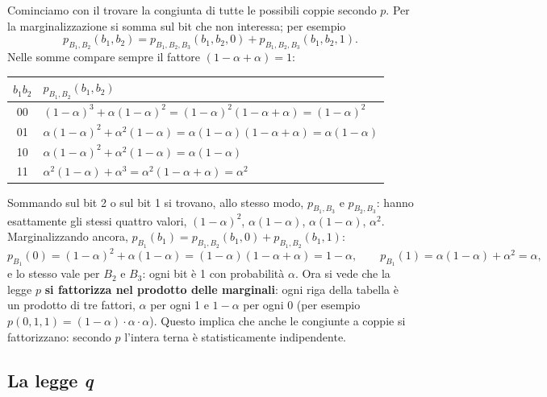Cominciamo con il trovare la congiunta di tutte le possibili coppie secondo $p$. Per la marginalizzazione si somma
sul bit che non interessa; per esempio
\[ p_{B_1,B_2}(b_1, b_2) = p_{B_1,B_2,B_3}(b_1, b_2, 0) + p_{B_1,B_2,B_3}(b_1, b_2, 1) . \]
Nelle somme compare sempre il fattore $(1 - \alpha + \alpha) = 1$:
\begin{center}
\renewcommand{\arraystretch}{1.3}
\begin{tabular}{@{}cl@{}}
  \toprule
  $b_1 b_2$ & $p_{B_1,B_2}(b_1, b_2)$ \\
  \midrule
  00 & $(1-\alpha)^3 + \alpha(1-\alpha)^2 = (1-\alpha)^2 (1 - \alpha + \alpha) = (1-\alpha)^2$ \\
  01 & $\alpha(1-\alpha)^2 + \alpha^2(1-\alpha) = \alpha(1-\alpha)(1 - \alpha + \alpha) = \alpha(1-\alpha)$ \\
  10 & $\alpha(1-\alpha)^2 + \alpha^2(1-\alpha) = \alpha(1-\alpha)$ \\
  11 & $\alpha^2(1-\alpha) + \alpha^3 = \alpha^2(1 - \alpha + \alpha) = \alpha^2$ \\
  \bottomrule
\end{tabular}
\end{center}
Sommando sul bit 2 o sul bit 1 si trovano, allo stesso modo, $p_{B_1,B_3}$ e $p_{B_2,B_3}$: hanno esattamente gli
stessi quattro valori, $(1-\alpha)^2$, $\alpha(1-\alpha)$, $\alpha(1-\alpha)$, $\alpha^2$. Marginalizzando ancora,
$p_{B_1}(b_1) = p_{B_1,B_2}(b_1, 0) + p_{B_1,B_2}(b_1, 1)$:
\[
  p_{B_1}(0) = (1-\alpha)^2 + \alpha(1-\alpha) = (1-\alpha)(1 - \alpha + \alpha) = 1 - \alpha , \qquad
  p_{B_1}(1) = \alpha(1-\alpha) + \alpha^2 = \alpha ,
\]
e lo stesso vale per $B_2$ e $B_3$: ogni bit è 1 con probabilità $\alpha$. Ora si vede che la legge $p$ \textbf{si
fattorizza nel prodotto delle marginali}: ogni riga della tabella è un prodotto di tre fattori, $\alpha$ per ogni 1 e
$1 - \alpha$ per ogni 0 (per esempio $p(0, 1, 1) = (1-\alpha) \cdot \alpha \cdot \alpha$). Questo implica che anche le
congiunte a coppie si fattorizzano: secondo $p$ l'intera terna è statisticamente indipendente.

\subsection{La legge \emph{q}}


